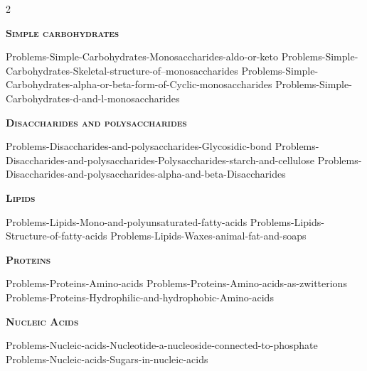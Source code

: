 \documentclass[main.tex]{subfiles}
\begin{document}
\newpage
\fancyhfoffset[E,O]{0pt}
\setlength{\columnsep}{30pt}
\begin{conclusion}
\end{conclusion}
\begin{multicols*}{2}\setcounter{numA}{1}  %












{\raggedright\textsc{\textbf{Simple carbohydrates}}\par}
 
  {Problems-Simple-Carbohydrates-Monosaccharides-aldo-or-keto}
 {Problems-Simple-Carbohydrates-Skeletal-structure-of--monosaccharides}
 {Problems-Simple-Carbohydrates-alpha-or-beta-form-of-Cyclic-monosaccharides}
 {Problems-Simple-Carbohydrates-d-and-l-monosaccharides}
{\raggedright\textsc{\textbf{Disaccharides and polysaccharides}}\par}
 {Problems-Disaccharides-and-polysaccharides-Glycosidic-bond}
 {Problems-Disaccharides-and-polysaccharides-Polysaccharides-starch-and-cellulose}
 {Problems-Disaccharides-and-polysaccharides-alpha-and-beta-Disaccharides}
{\raggedright\textsc{\textbf{Lipids}}\par}
 {Problems-Lipids-Mono-and-polyunsaturated-fatty-acids}
 {Problems-Lipids-Structure-of-fatty-acids}
 {Problems-Lipids-Waxes-animal-fat-and-soaps}
{\raggedright\textsc{\textbf{Proteins}}\par}
  {Problems-Proteins-Amino-acids}
 {Problems-Proteins-Amino-acids-as-zwitterions}
 {Problems-Proteins-Hydrophilic-and-hydrophobic-Amino-acids}
{\raggedright\textsc{\textbf{Nucleic Acids}}\par}
 {Problems-Nucleic-acids-Nucleotide-a-nucleoside-connected-to-phosphate}
 {Problems-Nucleic-acids-Sugars-in-nucleic-acids}
 


\end{multicols*}
\end{document}
